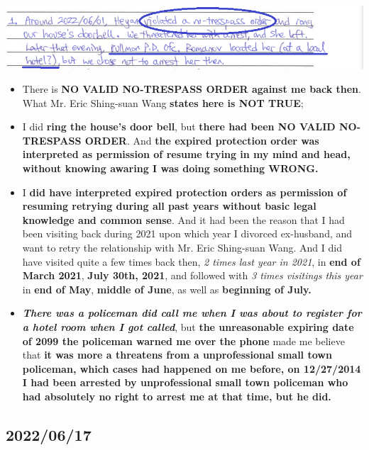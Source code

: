 \documentclass[9pt, b5paper]{article}
\begin{document}
\includegraphics[width=.9\linewidth]{./pic/dearCousin_20220920_142716.png}
\begin{itemize}
\item There is \textbf{NO VALID NO-TRESPASS ORDER against me back then}. What Mr. Eric Shing-suan Wang \textbf{states here is NOT TRUE};
\item I did \textbf{ring the house's door bell}, but \textbf{there had been NO VALID NO-TRESPASS ORDER}. And \textbf{the expired protection order was interpreted as permission of resume trying in my mind and head, without knowing awaring I was doing something WRONG.}
\item I \textbf{did have interpreted expired protection orders as permission of resuming retrying during all past years without basic legal knowledge and common sense}. And it had been the reason that I had been visiting back during 2021 upon which year I divorced ex-husband, and want to retry the relationship with Mr. Eric Shing-suan Wang. And I did have visited quite a few times back then, \emph{2 times last year in 2021}, in \textbf{end of March 2021}, \textbf{July 30th, 2021}, and followed with \emph{3 times visitings this year} in \textbf{end of May}, \textbf{middle of June}, as well as \textbf{beginning of July.}
\item \emph{\textbf{There was a policeman did call me when I was about to register for a hotel room when I got called}}, but \textbf{the unreasonable expiring date of 2099 the policeman warned me over the phone} made me believe that \textbf{it was more a threatens from a unprofessional small town policeman, which cases had happened on me before, on 12/27/2014 I had been arrested by unprofessional small town policeman who had absolutely no right to arrest me at that time, but he did.}
\end{itemize}
\subsection{2022/06/17}
\label{sec-4-2}
\end{document}
